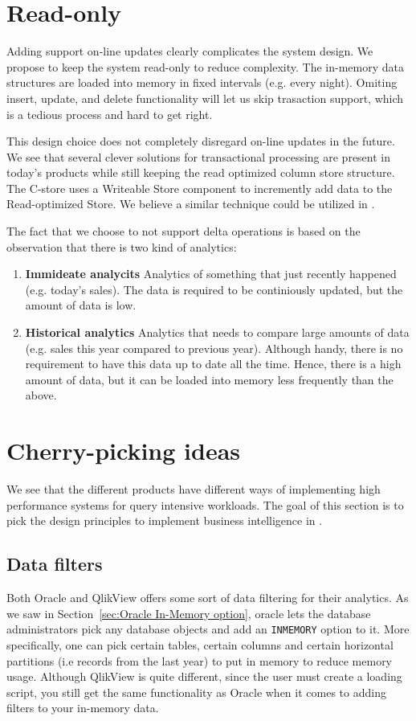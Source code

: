 \section{Read-only}
\label{sec:Read-only}
Adding support on-line updates clearly complicates the system design. We propose to keep the system read-only to reduce complexity. The in-memory data structures are loaded into memory in fixed intervals (e.g. every night). Omiting insert, update, and delete functionality will let us skip trasaction support, which is a tedious process and hard to get right.

This design choice does not completely disregard on-line updates in the future. We see that several clever solutions for transactional processing are present in today's products while still keeping the read optimized column store structure. The C-store uses a Writeable Store component to incremently add data to the Read-optimized Store. We believe a similar technique could be utilized in \projectName.

The fact that we choose to not support delta operations is based on the observation that there is two kind of analytics: 
\begin{enumerate}
  \item \textbf{Immideate analycits} Analytics of something that just recently happened (e.g. today's sales). The data is required to be continiously updated, but the amount of data is low.
  \item \textbf{Historical analytics} Analytics that needs to compare large amounts of data (e.g. sales this year compared to previous year). Although handy, there is no requirement to have this data up to date all the time. Hence, there is a high amount of data, but it can be loaded into memory less frequently than the above.
\end{enumerate}


\section{Cherry-picking ideas}
\label{sec:Cherry-picking ideas}
We see that the different products have different ways of implementing high performance systems for query intensive workloads. The goal of this section is to pick the design principles to implement business intelligence in \genusSoftware.

\subsection{Data filters}
\label{sub:Data filters}
Both Oracle and QlikView offers some sort of data filtering for their analytics. As we saw in Section~\ref{sec:Oracle In-Memory option}, oracle lets the database administrators pick any database objects and add an \texttt{INMEMORY} option to it. More specifically, one can pick certain tables, certain columns and certain horizontal partitions (i.e records from the last year) to put in memory to reduce memory usage. Although QlikView is quite different, since the user must create a loading script, you still get the same functionality as Oracle when it comes to adding filters to your in-memory data.

